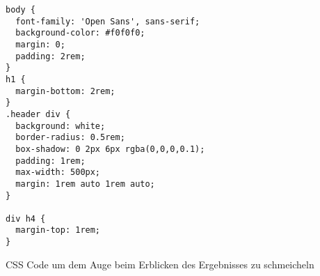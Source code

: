 \begin{listing}
\begin{verbatim}
body {
  font-family: 'Open Sans', sans-serif;
  background-color: #f0f0f0;
  margin: 0;
  padding: 2rem;
}
h1 {
  margin-bottom: 2rem;
}
.header div {
  background: white;
  border-radius: 0.5rem;
  box-shadow: 0 2px 6px rgba(0,0,0,0.1);
  padding: 1rem;
  max-width: 500px;
  margin: 1rem auto 1rem auto;
}

div h4 {
  margin-top: 1rem;
}
\end{verbatim}
\caption{CSS Code um dem Auge beim Erblicken des Ergebnisses zu schmeicheln}
\label{lst:descr:js:code5}
\end{listing}
